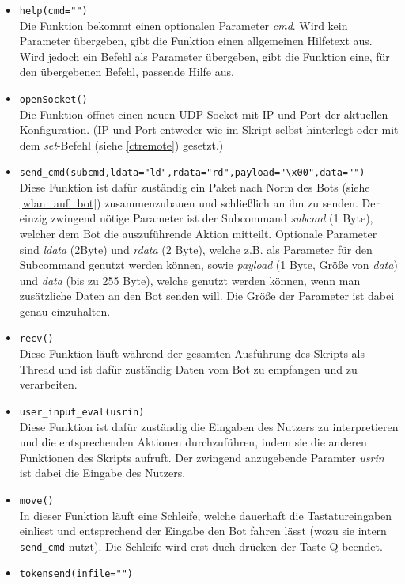 \begin{itemize}
    \item \verb+help(cmd="")+\\
    Die Funktion bekommt einen optionalen Parameter \textit{cmd}. Wird kein Parameter übergeben, gibt die Funktion einen allgemeinen Hilfetext aus. Wird jedoch ein Befehl als Parameter übergeben, gibt die Funktion eine, für den übergebenen Befehl, passende Hilfe aus.
    \item \verb+openSocket()+\\
    Die Funktion öffnet einen neuen UDP-Socket mit IP und Port der aktuellen Konfiguration. (IP und Port entweder wie im Skript selbst hinterlegt oder mit dem \textit{set}-Befehl (siehe \ref{ctremote}) gesetzt.)
    \item \verb+send_cmd(subcmd,ldata="ld",rdata="rd",payload="\x00",data="")+\\
    Diese Funktion ist dafür zuständig ein Paket nach Norm des Bots (siehe \ref{wlan_auf_bot}) zusammenzubauen und schließlich an ihn zu senden.
    Der einzig zwingend nötige Parameter ist der Subcommand \textit{subcmd} (1 Byte), welcher dem Bot die auszuführende Aktion mitteilt.
    Optionale Parameter sind \textit{ldata} (2Byte) und \textit{rdata} (2 Byte), welche z.B. als Parameter für den Subcommand genutzt werden können, sowie \textit{payload} (1 Byte, Größe von \textit{data}) und \textit{data} (bis zu 255 Byte), welche genutzt werden können, wenn man zusätzliche Daten an den Bot senden will.
    Die Größe der Parameter ist dabei genau einzuhalten.
    \item \verb+recv()+\\
    Diese Funktion läuft während der gesamten Ausführung des Skripts als Thread und ist dafür zuständig Daten vom Bot zu empfangen und zu verarbeiten.
    \item \verb+user_input_eval(usrin)+\\
    Diese Funktion ist dafür zuständig die Eingaben des Nutzers zu interpretieren und die entsprechenden Aktionen durchzuführen, indem sie die anderen Funktionen des Skripts aufruft.
    Der zwingend anzugebende Paramter \textit{usrin} ist dabei die Eingabe des Nutzers.
    \item \verb+move()+\\
    In dieser Funktion läuft eine Schleife, welche dauerhaft die Tastatureingaben einliest und entsprechend der Eingabe den Bot fahren lässt (wozu sie intern \verb+send_cmd+ nutzt). Die Schleife wird erst duch drücken der Taste Q beendet.
    \item \verb+tokensend(infile="")+\\

\end{itemize}
